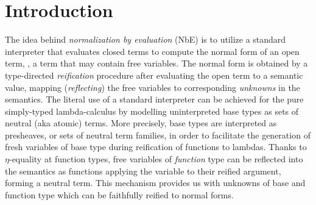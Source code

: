 \documentclass[sigconf,screen,fleqn]{acmart} %
\begin{document}



\maketitle

\setlength{\mathindent}{\parindent}


\section{Introduction}
\label{sec:intro}

The idea behind \emph{normalization by evaluation} (NbE) is to utilize a
standard interpreter that evaluates closed terms to compute the
normal form of an open term, \ie, a term that may contain free variables.
The normal form is obtained by a type-directed \emph{reification}
procedure after evaluating the open term to a semantic value, mapping
(\emph{reflecting})
the free variables to corresponding \emph{unknowns} in the semantics.
The literal use of a standard interpreter
can be achieved for the pure simply-typed lambda-calculus
\cite{bergerSchwichtenberg:lics91,filinski:semaccounttdpe}
by modelling uninterpreted base types as sets of neutral (aka atomic)
terms.   More precisely, base types are interpreted
as presheaves, or sets of neutral term
families, in order to facilitate the generation of
fresh variables of base type during
reification of functions to lambdas.
Thanks to $\eta$-equality at function types, free variables of
\emph{function} type can be reflected into the semantics as functions
applying the variable to their reified argument,
forming a neutral term.  This mechanism provides us with unknowns of
base and function type which can be faithfully reified to normal forms.
\end{document}
